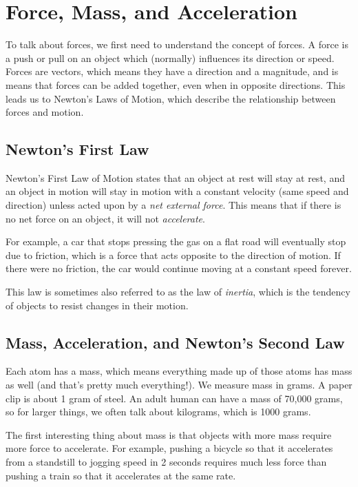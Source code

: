 \chapter{Force, Mass, and Acceleration}
To talk about forces, we first need to understand the concept of forces. A force is a push or pull on an object which (normally) influences its direction or speed. Forces are vectors, which means they have a direction and a magnitude, and is means that forces can be added together, even when in opposite directions. This leads us to Newton's Laws of Motion, which describe the relationship between forces and motion.

\section{Newton's First Law}
Newton's First Law of Motion states that an object at rest will stay at rest, and an object in motion will stay in motion with a constant velocity (same speed and direction) unless acted upon by a \emph{net external force}. This means that if there is no net force on an object, it will not \emph{accelerate}. 

For example, a car that stops pressing the gas on a flat road will eventually stop due to friction, which is a force that acts opposite to the direction of motion. If there were no friction, the car would continue moving at a constant speed forever.

This law is sometimes also referred to as the law of \emph{inertia}, which is the tendency of objects to resist changes in their motion. 
\section{Mass, Acceleration, and Newton's Second Law}

Each atom has a mass, which means everything made up of those atoms has mass as 
well (and that's pretty much everything!). We measure mass in grams. A paper clip is about 1 gram of steel. An adult human can have a mass of 70,000 grams, so for larger things, we often talk about kilograms, which is 1000 grams.

The first interesting thing about mass is that objects with more mass
require more force to accelerate. For example, pushing a bicycle so
that it accelerates from a standstill to jogging speed in 2 seconds
requires much less force than pushing a train so that it accelerates
at the same rate.


